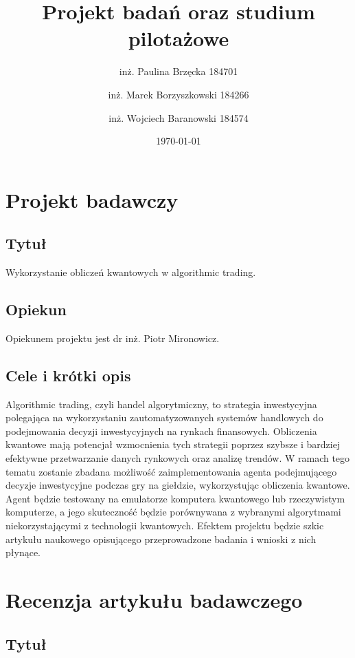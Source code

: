 \documentclass[polish,envcountsect,10pt]{article}
\title{Projekt badań oraz studium pilotażowe}
\author{inż. Paulina Brzęcka 184701 \and inż. Marek Borzyszkowski 184266 \and inż. Wojciech Baranowski 184574}
\date{\today}
\begin{document}
\maketitle
\tableofcontents
\newpage

\section{Projekt badawczy}

\subsection{Tytuł}

Wykorzystanie obliczeń kwantowych w algorithmic trading.

\subsection{Opiekun}

Opiekunem projektu jest dr inż. Piotr Mironowicz.

\subsection{Cele i krótki opis}

Algorithmic trading, czyli handel algorytmiczny, to strategia inwestycyjna polegająca na wykorzystaniu zautomatyzowanych systemów handlowych do podejmowania decyzji inwestycyjnych na rynkach finansowych. Obliczenia kwantowe mają potencjał wzmocnienia tych strategii poprzez szybsze i bardziej efektywne przetwarzanie danych rynkowych oraz analizę trendów. W ramach tego tematu zostanie zbadana możliwość zaimplementowania agenta podejmującego decyzje inwestycyjne podczas gry na giełdzie, wykorzystując obliczenia kwantowe. Agent będzie testowany na emulatorze komputera kwantowego lub rzeczywistym komputerze, a jego skuteczność będzie porównywana z wybranymi algorytmami niekorzystającymi z technologii kwantowych. Efektem projektu będzie szkic artykułu naukowego opisującego przeprowadzone badania i wnioski z nich płynące.

\section{Recenzja artykułu badawczego}

\subsection{Tytuł}
\end{document}
